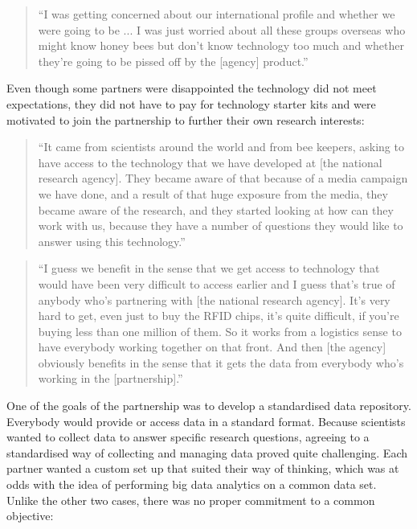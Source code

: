 \begin{quote}
\small
\enquote{I was getting concerned about our international profile and whether we were going to be ... I was just worried about all these groups overseas who might know honey bees but don't know technology too much and whether they're going to be pissed off by the [agency] product.} \\
\end{quote}

Even though some partners were disappointed the technology did not meet expectations, they did not have to pay for technology starter kits and were motivated to join the partnership to further their own research interests:

\begin{quote}
\small
\enquote{It came from scientists around the world and from bee keepers, asking to have access to the technology that we have developed at [the national research agency]. They became aware of that because of a media campaign we have done, and a result of that huge exposure from the media, they became aware of the research, and they started looking at how can they work with us, because they have a number of questions they would like to answer using this technology.} \\
\end{quote}

\begin{quote}
\small
\enquote{I guess we benefit in the sense that we get access to technology that would have been very difficult to access earlier and I guess that's true of anybody who’s partnering with [the national research agency]. It's very hard to get, even just to buy the RFID chips, it's quite difficult, if you're buying less than one million of them. So it works from a logistics sense to have everybody working together on that front. And then [the agency] obviously benefits in the sense that it gets the data from everybody who's working in the [partnership].} \\
\end{quote}
 
One of the goals of the partnership was to develop a standardised data repository. Everybody would provide or access data in a standard format. Because scientists wanted to collect data to answer specific research questions, agreeing to a standardised way of collecting and managing data proved quite challenging. Each partner wanted a custom set up that suited their way of thinking, which was at odds with the idea of performing big data analytics on a common data set. Unlike the other two cases, there was no proper commitment to a common objective:

